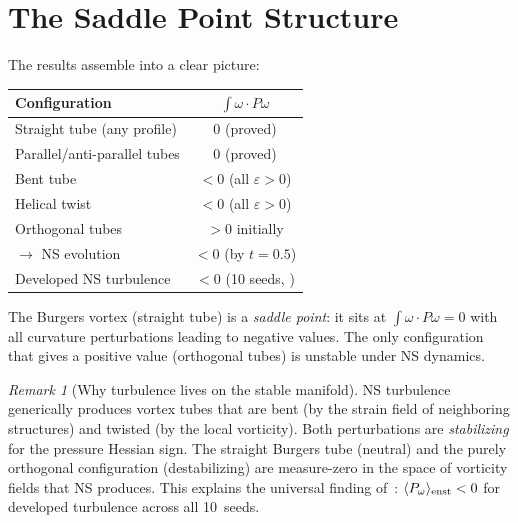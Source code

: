 \documentclass[11pt,a4paper]{article}
\theoremstyle{plain}
\theoremstyle{definition}
\theoremstyle{remark}
\newtheorem{remark}[theorem]{Remark}
\begin{document}
\section{The Saddle Point Structure}\label{sec:saddle}

The results assemble into a clear picture:

\begin{center}
\renewcommand{\arraystretch}{1.2}
\begin{tabular}{@{}lc@{}}
\toprule
\textbf{Configuration} & $\int\omega\cdot P\omega$ \\
\midrule
Straight tube (any profile) & $0$ (proved) \\
Parallel/anti-parallel tubes & $0$ (proved) \\
Bent tube & $<0$ (all $\varepsilon>0$) \\
Helical twist & $<0$ (all $\varepsilon>0$) \\
Orthogonal tubes & $>0$ initially \\
\quad$\to$ NS evolution & $<0$ (by $t=0.5$) \\
Developed NS turbulence & $<0$ (10 seeds, \cite{Fontes2026eigen}) \\
\bottomrule
\end{tabular}
\end{center}

The Burgers vortex (straight tube) is a
\emph{saddle point}: it sits at
$\int\omega\cdot P\omega = 0$ with
all curvature perturbations leading to negative
values.  The only configuration that gives a
positive value (orthogonal tubes) is unstable
under NS dynamics.

\begin{remark}[Why turbulence lives on the
stable manifold]
\label{rem:stable-manifold}
NS turbulence generically produces vortex tubes
that are bent (by the strain field of neighboring
structures) and twisted (by the local vorticity).
Both perturbations are \emph{stabilizing} for the
pressure Hessian sign.  The straight Burgers tube
(neutral) and the purely orthogonal configuration
(destabilizing) are measure-zero in the space of
vorticity fields that NS produces.  This explains
the universal finding of~\cite{Fontes2026eigen}:
$\langle P_\omega\rangle_{\rm enst}<0$ for
developed turbulence across all 10~seeds.
\end{remark}


\end{document}
